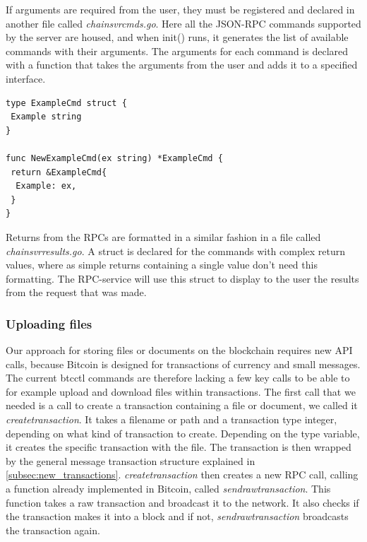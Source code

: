 \documentclass[12pt]{article}
\begin{document}
If arguments are required from the user, they must be registered and declared in another file called {\it{chainsvrcmds.go}}. Here all the JSON-RPC commands supported by the server are housed, and when init() runs, it generates the list of available commands with their arguments. The arguments for each command is declared with a function that takes the arguments from the user and adds it to a specified interface. 


\begin{lstlisting}[float=h!,caption={Command argument formatting},label=lst:cmdArg]
type ExampleCmd struct {
 Example string
}

func NewExampleCmd(ex string) *ExampleCmd {
 return &ExampleCmd{
  Example: ex,
 }
}
\end{lstlisting}

Returns from the RPCs are formatted in a similar fashion in a file called \textit{chainsvrresults.go}. A struct is declared for the commands with complex return values, where as simple returns containing a single value don't need this formatting. The RPC-service will use this struct to display to the user the results from the request that was made. 
 
\subsubsection{Uploading files}
Our approach for storing files or documents on the blockchain requires new API calls, because Bitcoin is designed for transactions of currency and small messages. The current btcctl commands are therefore lacking a few key calls to be able to for example upload and download files within transactions. The first call that we needed is a call to create a transaction containing a file or document, we called it \textit{createtransaction}.  It takes a filename or path and a transaction type integer, depending on what kind of transaction to create. Depending on the type variable, it creates the specific transaction with the file. The transaction is then wrapped by the general message transaction structure explained in \ref{subsec:new_transactions}. \textit{createtransaction} then creates a new RPC call, calling a function already implemented in Bitcoin, called \textit{sendrawtransaction}. This function takes a raw transaction and broadcast it to the network. It also checks if the transaction makes it into a block and if not, \textit{sendrawtransaction} broadcasts the transaction again. 
\end{document}
